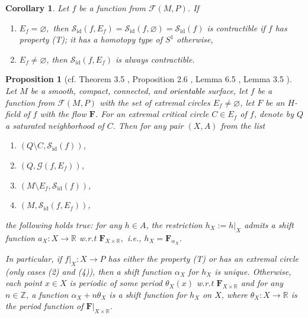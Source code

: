 \documentclass[10pt,reqno]{amsart}
\newtheorem{proposition}[subsection]{Proposition}
\newtheorem{corollary}[subsection]{Corollary}
\newcommand{\bbR}{\mathbb{R}}
\newcommand{\bfF}{\mathbf{F}}
\newcommand{\Sid}{\mathcal{S}_{\id}(f)}
\newcommand{\F}{\mathcal{F}(M,P)}
\newcommand{\id}{\mathrm{id}}
\newcommand{\textr}[1]{\textcolor{black}{#1}}
\begin{document}
\begin{corollary}\label{cor:hom-type-SidE}
	Let $f$ be a function from $\F$.  If
	\begin{enumerate}[label={\rm (\alph*)}]
		\item $E_f = \varnothing,$ then  $\mathcal{S}_{\id}(f,E_f) = \mathcal{S}_{\id}(f,\varnothing) = \Sid$ is contractible if $f$ has property {\rm (T)}; it has a homotopy type of $S^1$ otherwise,
		\item $E_f\neq \varnothing$, then $\mathcal{S}_{\id}(f,E_f)$ is always contractible.
	\end{enumerate}
\end{corollary}


{
\begin{proposition}[cf.  Theorem 3.5	\cite{Maksymenko:OsakaJM:2011}, Proposition 2.6 \cite{Maksymenko:NKolyv:2009},  Lemma 6.5 \cite{Maksymenko:DefFuncI:2014}, Lemma 3.5 \cite{Maksymenko:AGAG:2006}]\label{prop:shift-functions-exist} 
Let $M$ be a smooth, compact, connected, and \textr{orientable} surface, let $f$ be a function from $\F$ with the set of extremal circles $E_f\neq \varnothing$, let $F$ be an $H$-field of $f$ with the flow $\bfF$. For an extremal critical circle $C\in E_f$ of $f$, denote by $Q$ a saturated neighborhood of $C$. Then 
for any pair $(X,A)$ from the list 
	\begin{enumerate}
		\item $(Q\setminus C, \mathcal{S}_{\id}(f))$,
		\item $(Q, \mathcal{G}(f,E_f))$,
		\item  $( M\setminus E_f,\Sid)$,
		\item $(M,\mathcal{S}_{\id}(f,E_f))$,
	\end{enumerate}
	the following holds true: for any $h\in A$, the restriction $h_X:=h|_{X}$ admits a shift function $a_X:X\to \bbR$ w.r.t $\bfF_{X\times\bbR}, $ i.e., $h_X = \bfF_{\alpha_X}$. 
	
	In particular, if $f|_X:X\to P$ has either the property {\rm(T)} or has an extremal circle {\rm(}only cases {\rm (2)} and {\rm (4)}{\rm)}, then a shift function $\alpha_X$ for $h_X$ is unique. Otherwise, each point $x\in X$ is periodic of some period $\theta_X(x)$ w.r.t $\bfF_{X\times \bbR}$ and for any $n\in \mathbb{Z}$, a function $\alpha_X+n\theta_X$ is a shift function for $h_X$ on $X$, where $\theta_X:X\to\bbR$ is the period function of $\bfF|_{X\times\bbR}$. 
\end{proposition}}
\end{document}

